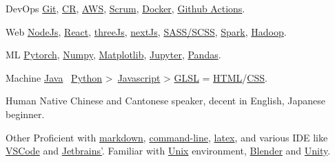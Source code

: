 
\begin{cvskills}

  \cvskill
    {DevOps} %
    {\href{https://git-scm.com/}{Git}, \href{https://en.wikipedia.org/wiki/Code_review}{CR}, \href{https://aws.amazon.com/}{AWS}, \href{https://www.scrum.org/resources/what-is-scrum}{Scrum}, \href{https://www.docker.com/}{Docker}, \href{https://github.com/features/actions}{Github Actions}.}

  \cvskill
    {Web} %
    {\href{https://nodejs.org/en/}{NodeJs}, \href{https://reactjs.org/}{React}, \href{https://threejs.org/}{threeJs}, \href{https://nextjs.org/}{nextJs}, \href{https://sass-lang.com/}{SASS/SCSS}, \href{https://spark.apache.org/}{Spark}, \href{https://hadoop.apache.org/}{Hadoop}.}

  \cvskill
    {ML} %
    {\href{https://pytorch.org/}{Pytorch}, \href{https://numpy.org/}{Numpy}, \href{https://matplotlib.org/}{Matplotlib}, \href{https://jupyter.org/}{Jupyter}, \href{https://pandas.pydata.org/}{Pandas}.}  %

  \cvskill
    {Machine}
    {\href{https://www.java.com/en/}{Java} \gtrsim\, \href{https://www.python.org/}{Python} >\, \href{https://www.javascript.com/}{Javascript} > \href{https://www.khronos.org/opengl/wiki/OpenGL_Shading_Language}{GLSL} = \href{https://developer.mozilla.org/en-US/docs/Glossary/HTML5}{HTML}/\href{https://developer.mozilla.org/en-US/docs/Web/CSS}{CSS}.}

  \cvskill
    {Human}
    {Native Chinese and Cantonese speaker, decent in English, Japanese beginner.}

  \cvskill
    {Other} %
    {Proficient with \href{https://en.wikipedia.org/wiki/Markdown}{markdown}, \href{https://en.wikipedia.org/wiki/Command-line_interface}{command-line}, \href{https://www.latex-project.org/}{latex}, and various IDE like \href{https://code.visualstudio.com/}{VSCode} and \href{https://www.jetbrains.com/}{Jetbrains'}. Familiar with \href{https://en.wikipedia.org/wiki/Unix}{Unix} environment, \href{https://www.blender.org/}{Blender} and \href{https://unity.com/}{Unity}.}

\end{cvskills}
